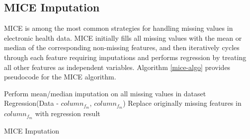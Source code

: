 \documentclass[review]{elsarticle}
\begin{document}
\subsection*{MICE Imputation}
MICE is among the most common strategies for handling missing values in electronic health data\cite{azur2011multiple}. MICE initially fills all missing values with the mean or median of the corresponding non-missing features, and then iteratively cycles through each feature requiring imputations and performs regression by treating all other features as independent variables. Algorithm \ref{mice-algo} provides pseudocode for the MICE algorithm.
	
\begin{algorithm}[H]
	\begin{algorithmic}[1]
			\State Perform mean/median imputation on all missing values in dataset
					\State Regression(Data - $column_{f_m}$, $column_{f_m}$)
					\State Replace originally missing features in $column_{f_m}$ with regression result
				\EndFor
			\EndFor
		\EndFunction
		
	\end{algorithmic}
	\caption{MICE Imputation}
	\label{mice-algo}
\end{algorithm}
\end{document}
